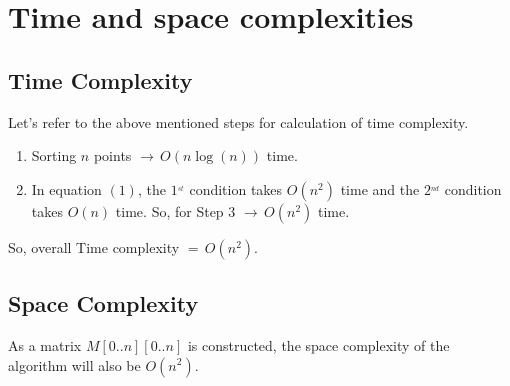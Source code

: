\documentclass{article}
\begin{document}
  \section{Time and space complexities}
  
    \subsection{Time Complexity}
    Let's refer to the above mentioned steps for calculation of time complexity.
    \begin{enumerate}
        \item Sorting $n$ points $\rightarrow\,O(n\log(n))$ time.
        \item In equation $(1)$, the $1^_{st}$ condition takes $O(n^2)$ time and the 
        $2^_{nd}$ condition takes $O(n)$ time. So, for Step $3$ $\rightarrow\,O(n^2)$
        time.
    \end{enumerate}
    So, overall Time complexity $=\,O(n^2)$.
    
    \subsection{Space Complexity}
    As a matrix $M[0..n][0..n]$ is constructed, the space complexity of the algorithm 
    will also be $O(n^2)$.\\
    
\end{document}
